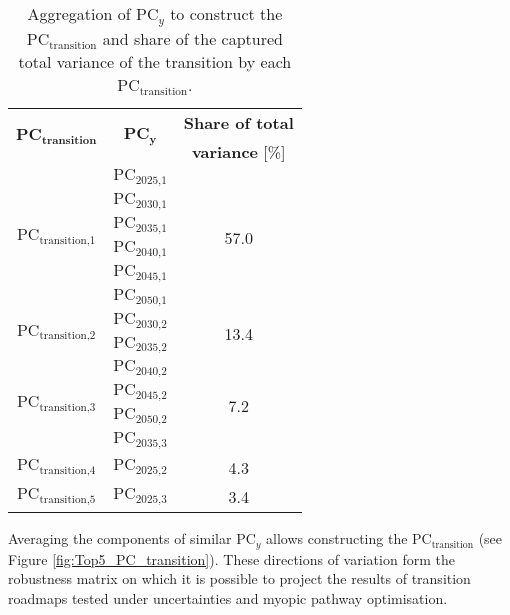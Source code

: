 \begin{table}[htbp!]
\caption{Aggregation of $\text{PC}_y$ to construct the $\text{PC}_{\text{transition}}$ and share of the captured total variance of the transition by each $\text{PC}_{\text{transition}}$.}
\label{tab:PC_transition_aggregation}
\centering
\begin{tabular}{c c c}
\toprule
 \multirow{2}{*}{$\mathbf{\textbf{PC}_{\textbf{transition}}}$} & \multirow{2}{*}{$\mathbf{\textbf{PC}_{\textbf{y}}}$} & \textbf{Share of total} \\	
 &  & \textbf{variance} [\%] \\	
 \midrule
\multirow{6}{*}{$\text{PC}_{\text{transition,1}}$} & $\text{PC}_{\text{2025,1}}$ & \multirow{6}{*}{57.0}\\
& $\text{PC}_{\text{2030,1}}$ & \\
& $\text{PC}_{\text{2035,1}}$ & \\
& $\text{PC}_{\text{2040,1}}$ & \\
& $\text{PC}_{\text{2045,1}}$ & \\
& $\text{PC}_{\text{2050,1}}$ & \\
 \midrule
\multirow{2}{*}{$\text{PC}_{\text{transition,2}}$} & $\text{PC}_{\text{2030,2}}$ & \multirow{2}{*}{13.4}\\
& $\text{PC}_{\text{2035,2}}$ & \\
\midrule
\multirow{4}{*}{$\text{PC}_{\text{transition,3}}$} & $\text{PC}_{\text{2040,2}}$ & \multirow{4}{*}{7.2}\\
& $\text{PC}_{\text{2045,2}}$ & \\
& $\text{PC}_{\text{2050,2}}$ & \\
& $\text{PC}_{\text{2035,3}}$ & \\
 \midrule
$\text{PC}_{\text{transition,4}}$ & $\text{PC}_{\text{2025,2}}$ & 4.3\\
 \midrule
$\text{PC}_{\text{transition,5}}$ & $\text{PC}_{\text{2025,3}}$ & 3.4\\
\bottomrule							

\end{tabular}
\end{table}

\newpage
Averaging the components of similar $\text{PC}_y$ allows constructing the $\text{PC}_{\text{transition}}$ (see Figure \ref{fig:Top5_PC_transition}). These directions of variation form the robustness matrix on which it is possible to project the results of transition roadmaps tested under uncertainties and myopic pathway optimisation.

